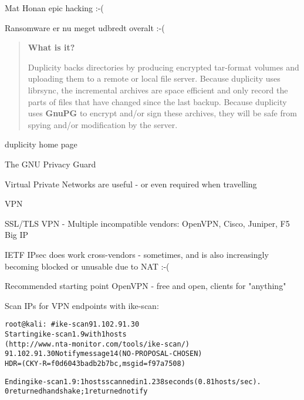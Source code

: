 \documentclass[20pt,landscape,a4paper,footrule]{foils}
\begin{document}
Mat Honan epic hacking :-(\\ {\small{}}

Ransomware er nu meget udbredt overalt :-(



\begin{quote}
{\large\bf What is it?}

Duplicity backs directories by producing encrypted tar-format volumes and uploading them to a remote or local file server. Because duplicity uses librsync, the incremental archives are space efficient and only record the parts of files that have changed since the last backup. Because duplicity uses {\bf GnuPG} to encrypt and/or sign these archives, they will be safe from spying and/or modification by the server.
\end{quote}

 duplicity home page

 The GNU Privacy Guard




\begin{list1}
\item Virtual Private Networks are useful - or even required when travelling
\item VPN 
\item SSL/TLS VPN - Multiple incompatible vendors: OpenVPN, Cisco, Juniper, F5 Big IP
\item IETF IPsec does work cross-vendors - sometimes, and is also increasingly becoming blocked or unusable due to NAT :-(
\item Recommended starting point OpenVPN - free and open, clients for "anything"
\end{list1}


Scan IPs for VPN endpoints with ike-scan:
\begin{alltt}\small
root@kali:~# ike-scan 91.102.91.30
Starting ike-scan 1.9 with 1 hosts
(http://www.nta-monitor.com/tools/ike-scan/)
91.102.91.30	Notify message 14 (NO-PROPOSAL-CHOSEN)
HDR=(CKY-R=f0d6043badb2b7bc, msgid=f97a7508)

Ending ike-scan 1.9: 1 hosts scanned in 1.238 seconds (0.81 hosts/sec).
0 returned handshake; 1 returned notify
\end{alltt}
\end{document}
